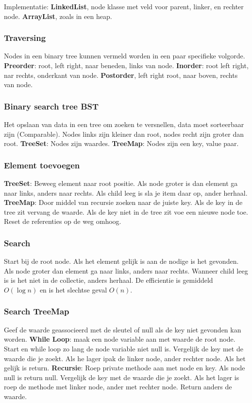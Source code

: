 Implementatie: \textbf{LinkedList}, node klasse met veld voor parent, linker, en rechter node.
\textbf{ArrayList}, zoals in een heap.

\subsubsection{Traversing}
Nodes in een binary tree kunnen vermeld worden in een paar specifieke volgorde.
\textbf{Preorder}: root, left right, naar beneden, links van node.
\textbf{Inorder}: root left right, nar rechts, onderkant van node.
\textbf{Postorder}, left right root, naar boven, rechts van node.

\subsubsection{Binary search tree BST}
Het opslaan van data in een tree om zoeken te versnellen, data moet sorteerbaar zijn (Comparable).
Nodes links zijn kleiner dan root, nodes recht zijn groter dan root.
\textbf{TreeSet}: Nodes zijn waardes.
\textbf{TreeMap}: Nodes zijn een key, value paar.

\subsubsection{Element toevoegen}
\textbf{TreeSet}: Beweeg element naar root positie.
Als node groter is dan element ga naar links, anders naar rechts.
Als child leeg is sla je item daar op, ander herhaal.
\textbf{TreeMap}: Door middel van recursie zoeken naar de juiste key.
Als de key in de tree zit vervang de waarde.
Als de key niet in de tree zit voe een nieuwe node toe.
Reset de referenties op de weg omhoog.

\subsubsection{Search}
Start bij de root node.
Als het element gelijk is aan de nodige is het gevonden.
Als node groter dan element ga naar links, anders naar rechts.
Wanneer child leeg is is het niet in de collectie, anders herhaal.
De efficientie is gemiddeld $O(\log n)$ en is het slechtse geval $O(n)$.

\subsubsection{Search TreeMap}
Geef de waarde geassocieerd met de sleutel of null als de key niet gevonden kan worden.
\textbf{While Loop}: maak een node variable aan met waarde de root node.
Start en while loop zo lang de node variable niet null is.
Vergelijk de key met de waarde die je zoekt.
Als he lager ipak de linker node, ander rechter node.
Als het gelijk is return.
\textbf{Recursie}: Roep private methode aan met node en key.
Als node null is return null.
Vergelijk de key met de waarde die je zoekt.
Als het lager is roep de methode met linker node, ander met rechter node.
Return anders de waarde.

